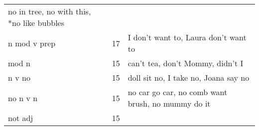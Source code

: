 \documentclass[man]{apa6}
\begin{document}
\begin{longtable}[]{@{}lll@{}}
\begin{minipage}[t]{0.47\columnwidth}
no in tree, no with this, *no like bubbles\strut
\end{minipage}\tabularnewline
\begin{minipage}[t]{0.23\columnwidth}\raggedright\strut
n mod v prep\strut
\end{minipage} & \begin{minipage}[t]{0.15\columnwidth}\raggedright\strut
17\strut
\end{minipage} & \begin{minipage}[t]{0.47\columnwidth}\raggedright\strut
I don't want to, Laura don't want to\strut
\end{minipage}\tabularnewline
\begin{minipage}[t]{0.23\columnwidth}\raggedright\strut
mod n\strut
\end{minipage} & \begin{minipage}[t]{0.15\columnwidth}\raggedright\strut
15\strut
\end{minipage} & \begin{minipage}[t]{0.47\columnwidth}\raggedright\strut
can't tea, don't Mommy, didn't I\strut
\end{minipage}\tabularnewline
\begin{minipage}[t]{0.23\columnwidth}\raggedright\strut
n v no\strut
\end{minipage} & \begin{minipage}[t]{0.15\columnwidth}\raggedright\strut
15\strut
\end{minipage} & \begin{minipage}[t]{0.47\columnwidth}\raggedright\strut
doll sit no, I take no, Joana say no\strut
\end{minipage}\tabularnewline
\begin{minipage}[t]{0.23\columnwidth}\raggedright\strut
no n v n\strut
\end{minipage} & \begin{minipage}[t]{0.15\columnwidth}\raggedright\strut
15\strut
\end{minipage} & \begin{minipage}[t]{0.47\columnwidth}\raggedright\strut
no car go car, no comb want brush, no mummy do it\strut
\end{minipage}\tabularnewline
\begin{minipage}[t]{0.23\columnwidth}\raggedright\strut
not adj\strut
\end{minipage} & \begin{minipage}[t]{0.15\columnwidth}\raggedright\strut
15\strut
\end{minipage} & \begin{minipage}[t]{0.47\columnwidth}\raggedright\strut

\end{minipage}
\end{longtable}
\end{document}
